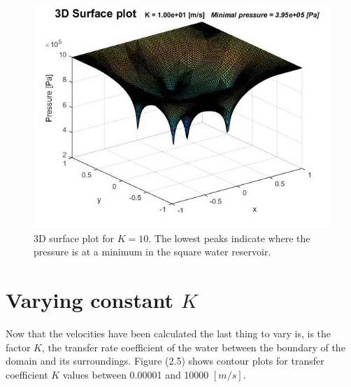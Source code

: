 \documentclass[a4paper]{report}
\begin{document}
\begin{figure}
	\centering
	\includegraphics[width=130mm]{K10_3Dsurface.jpg}
	\caption{3D surface plot for $K=10$. The lowest peaks indicate where the pressure is at a minimum in the square water reservoir.
	\label{overflow}}
\end{figure}


\newpage
\section{Varying constant $K$}

Now that the velocities have been calculated the last thing to vary is, is the factor $K$, the transfer rate coefficient of the water between the boundary of the domain and its surroundings. Figure (2.5) shows contour plots for transfer coefficient $K$ values between 0.00001 and 10000 $[m/s]$.\\
\end{document}

